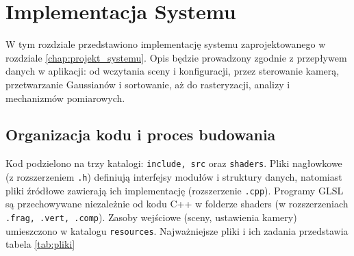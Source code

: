 \chapter{Implementacja Systemu}
\label{chap:implementation}
W tym rozdziale przedstawiono implementację systemu zaprojektowanego w rozdziale \ref{chap:projekt_systemu}. Opis będzie prowadzony zgodnie z przepływem danych w aplikacji: od wczytania sceny i konfiguracji, przez sterowanie kamerą, przetwarzanie Gaussianów i sortowanie, aż do rasteryzacji, analizy i mechanizmów pomiarowych.
\section{Organizacja kodu i proces budowania}
\label{sec:organizacja}
Kod podzielono na trzy katalogi: \texttt{include, src} oraz \texttt{shaders}. Pliki nagłowkowe (z rozszerzeniem \texttt{.h}) definiują interfejsy modułów i struktury danych, natomiast pliki źródłowe zawierają ich implementację (rozszerzenie \texttt{.cpp}). Programy GLSL są przechowywane niezależnie od kodu C++ w folderze shaders (w rozszerzeniach \texttt{.frag, .vert, .comp}). Zasoby wejściowe (sceny, ustawienia kamery) umieszczono w katalogu \texttt{resources}. Najważniejsze pliki i ich zadania przedstawia tabela \ref{tab:pliki}
